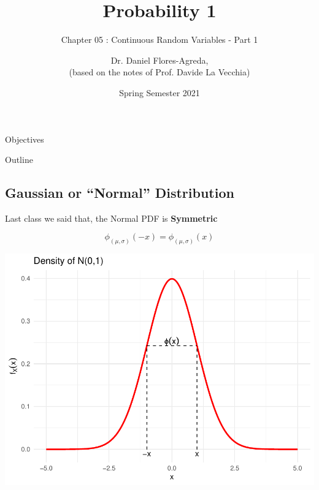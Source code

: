 \documentclass[smaller]{beamer}\usepackage[]{graphicx}\usepackage[]{color}
\newenvironment{knitrout}{}{} %
\begin{document}
\title[S110015]{Probability 1}
\subtitle{Chapter 05 : Continuous Random Variables - Part 1}
\author[Flores-Agreda, La Vecchia]{Dr. Daniel Flores-Agreda, \\[0.5em] \tiny{(based on the notes of Prof. Davide La Vecchia)}}
\date{Spring Semester 2021}

\begin{frame}
\titlepage
\end{frame}


\begin{frame}{Objectives}

\end{frame}

\begin{frame}{Outline}
\tableofcontents
\end{frame}


\subsection{Gaussian or ``Normal'' Distribution}

\begin{frame}{\subsecname}
  
  Last class we said that, the Normal PDF is \textbf{Symmetric}
  
  $$\phi_{(\mu,\sigma)}(-x) = \phi_{(\mu,\sigma)}(x)$$
  
\begin{knitrout}
\color{fgcolor}

{\centering \includegraphics[width=0.5\linewidth]{figure/unnamed-chunk-2-1} 

}



\end{knitrout}
  
\end{frame}
\end{document}
